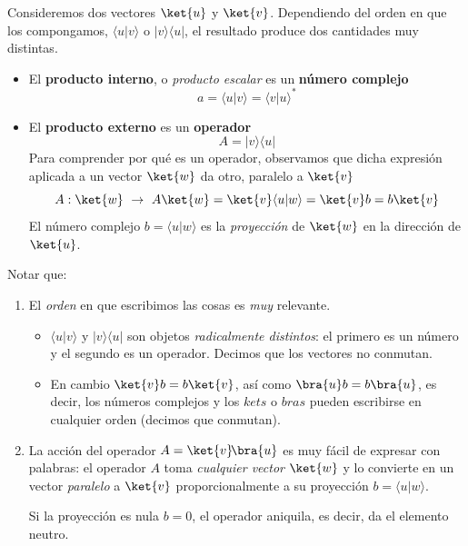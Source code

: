 \documentclass[a4paper,11pt]{book} %
\numberwithin{equation}{chapter}
\newcommand{\braket}[2]{\langle #1|#2\rangle}
\newcommand{\ketbra}[2]{| #1\rangle \! \langle #2|}
\begin{document}
Consideremos dos vectores $\ket{u}$ y $\ket{v}$. Dependiendo del orden en que los compongamos, $\braket{u}{v}$ o $\ketbra{v}{u}$, el resultado produce dos cantidades muy distintas.
\begin{itemize}
	\item El \textbf{producto interno}, o \textit{producto escalar} es un \textbf{número complejo}
$$
 a = \braket{u}{v} = \braket{v}{u}^* 
$$

	\item El \textbf{producto externo  }es un \textbf{operador}
	\begin{equation}
	A = \ketbra{v}{u}
	\end{equation}
Para comprender por qué es un operador, observamos que dicha expresión aplicada a un vector $\ket{w}$ da otro, paralelo a $\ket{v}$
	\begin{equation}
	A : \ket{w} ~\to ~ A\ket{w} =  \ket{v}\braket{u}{w}=\ket{v} b  = b \ket{v} 
	\end{equation}
El número complejo $b=\braket{u}{w}$ es  la \textit{proyección} de $\ket{w}$ en la dirección de $\ket{u}$.
\end{itemize}

\begin{mybox_blue}{Notar que:}
\begin{enumerate}
	\item El \textit{orden} en que escribimos las cosas es \textit{muy} relevante.
\vspace{0.1cm}	

	\begin{itemize}
		\item $\braket{u}{v}$ y $\ketbra{v}{u}$ son objetos \textit{radicalmente distintos}: el primero es un número y el segundo es un operador. Decimos que los vectores no conmutan.
\vspace{0.1cm}		
		
		\item En cambio $\ket{v} b  = b \ket{v}$, así como $\bra{u}b = b\bra{u}$, es decir,  los números complejos y los $kets$ o $bras$ pueden escribirse en cualquier orden (decimos que conmutan).
	\end{itemize}
	\vspace{0.2cm}
	
	\item La acción del operador  $A = \ket{v}\!\bra{u}$ es muy fácil de expresar con palabras: 
el operador $A$ toma \textit{cualquier vector} $\ket{w}$ y lo convierte en un vector \textit{paralelo} a $\ket{v}$ proporcionalmente a su proyección $b=\braket{u}{w}$. 
\vspace{0.1cm}

Si la proyección es nula $b=0$, el operador aniquila, es decir, da el elemento neutro.
\end{enumerate}

\end{mybox_blue}
\end{document}
